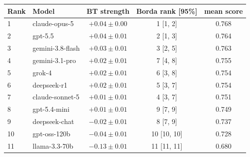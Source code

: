 \begin{tabular}{llccc}
\toprule
Rank & Model & BT strength & Borda rank [95\%] & mean score \\
\midrule
1 & claude-opus-5 & $+0.04 \pm 0.00$ & 1 [1, 2] & 0.768 \\
2 & gpt-5.5 & $+0.04 \pm 0.01$ & 2 [1, 3] & 0.764 \\
3 & gemini-3.8-flash & $+0.03 \pm 0.01$ & 3 [2, 5] & 0.763 \\
4 & gemini-3.1-pro & $+0.02 \pm 0.01$ & 7 [4, 8] & 0.755 \\
5 & grok-4 & $+0.02 \pm 0.01$ & 6 [3, 8] & 0.754 \\
6 & deepseek-r1 & $+0.02 \pm 0.01$ & 5 [3, 7] & 0.754 \\
7 & claude-sonnet-5 & $+0.01 \pm 0.01$ & 4 [3, 7] & 0.751 \\
8 & gpt-5.4-mini & $+0.01 \pm 0.01$ & 9 [7, 9] & 0.749 \\
9 & deepseek-chat & $-0.02 \pm 0.01$ & 8 [7, 9] & 0.737 \\
10 & gpt-oss-120b & $-0.04 \pm 0.01$ & 10 [10, 10] & 0.728 \\
11 & llama-3.3-70b & $-0.13 \pm 0.01$ & 11 [11, 11] & 0.680 \\
\bottomrule
\end{tabular}
